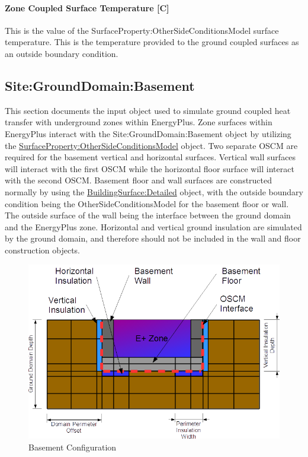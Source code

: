 \paragraph{Zone Coupled Surface Temperature {[}C{]}}\label{zone-coupled-surface-temperature-c}

This is the value of the SurfaceProperty:OtherSideConditionsModel surface temperature. This is the temperature provided to the ground coupled surfaces as an outside boundary condition.

\subsection{Site:GroundDomain:Basement}\label{sitegrounddomainbasement}

This section documents the input object used to simulate ground coupled heat transfer with underground zones within EnergyPlus. Zone surfaces within EnergyPlus interact with the Site:GroundDomain:Basement object by utilizing the \hyperref[surfacepropertyothersideconditionsmodel]{SurfaceProperty:OtherSideConditionsModel} object. Two separate OSCM are required for the basement vertical and horizontal surfaces. Vertical wall surfaces will interact with the first OSCM while the horizontal floor surface will interact with the second OSCM. Basement floor and wall surfaces are constructed normally by using the \hyperref[buildingsurfacedetailed]{BuildingSurface:Detailed} object, with the outside boundary condition being the OtherSideConditionsModel for the basement floor or wall. The outside surface of the wall being the interface between the ground domain and the EnergyPlus zone. Horizontal and vertical ground insulation are simulated by the ground domain, and therefore should not be included in the wall and floor construction objects.

\begin{figure}[htbp]
\centering
\includegraphics{media/image900.png}
\caption{Basement Configuration \protect \label{fig:basement-configuration}}
\end{figure}


